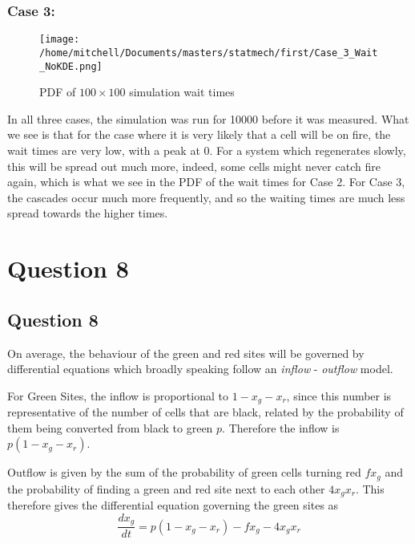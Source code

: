 \documentclass[11pt,a4paper]{article}
\begin{document}
\subsubsection{Case 3: }

\begin{figure}[H]
\centering
\texttt{[image: /home/mitchell/Documents/masters/statmech/first/Case\_3\_Wait\_NoKDE.png]}
\caption{PDF of $100 \times 100$ simulation wait times}
\end{figure}

In all three cases, the simulation was run for 10000 before it was measured. What we see is that for the case where it is very likely that a cell will be on fire, the wait times are very low, with a peak at 0. For a system which regenerates slowly, this will be spread out much more, indeed, some cells might never catch fire again, which is what we see in the PDF of the wait times for Case 2. For Case 3, the cascades occur much more frequently, and so the waiting times are much less spread towards the higher times. 

\section{Question 8}
\label{sec:question8}


\subsection{Question 8}
\label{sec:question8:subsec:parta}

On average, the behaviour of the green and red sites will be governed by differential equations which broadly speaking follow an \textit{inflow} - \textit{outflow} model. 

For Green Sites, the inflow is proportional to $1-x_g -x_r$, since this number is representative of the number of cells that are black, related by the probability of them being converted from black to green $p$. Therefore the inflow is $p(1-x_g-x_r)$. 

Outflow is given by the sum of the probability of green cells turning red $f x_g$ and the probability of finding a green and red site next to each other $4 x_g x_r$. This therefore gives the differential equation governing the green sites as 
\begin{equation}\label{eq:xg}
\frac{d x_g}{dt } = p (1 - x_g - x_r) - f x_g - 4 x_g x_r 
\end{equation}
\end{document}
